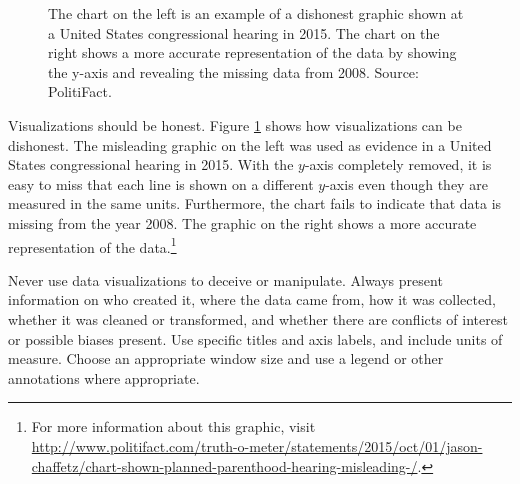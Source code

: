\begin{figure}[H]
\begin{subfigure}{.495\textwidth}
    \end{subfigure}
    \caption{The chart on the left is an example of a dishonest graphic shown at a United States congressional hearing in 2015. The chart on the right shows a more accurate representation of the data by showing the y-axis and revealing the missing data from 2008. Source: PolitiFact.}
    \label{fig:planparent}
\end{figure}

Visualizations should be honest.
Figure \ref{fig:planparent} shows how visualizations can be dishonest.
The misleading graphic on the left was used as evidence in a United States congressional hearing in 2015.
With the $y$-axis completely removed, it is easy to miss that each line is shown on a different $y$-axis even though they are measured in the same units.
Furthermore, the chart fails to indicate that data is missing from the year 2008.
The graphic on the right shows a more accurate representation of the data.\footnote{For more information about this graphic, visit \url{http://www.politifact.com/truth-o-meter/statements/2015/oct/01/jason-chaffetz/chart-shown-planned-parenthood-hearing-misleading-/}.}

Never use data visualizations to deceive or manipulate.
Always present information on who created it, where the data came from, how it was collected, whether it was cleaned or transformed, and whether there are conflicts of interest or possible biases present.
Use specific titles and axis labels, and include units of measure.
Choose an appropriate window size and use a legend or other annotations where appropriate.

